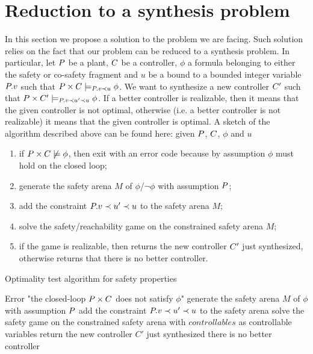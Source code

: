 
\section{Reduction to a synthesis problem}
\label{sec:reduction-to-synthesis}

In this section we propose a solution to the problem we are facing.
Such solution relies on the fact that our problem can be reduced to a synthesis problem.
In particular, let $P$ be a plant, $C$ be a controller, $\phi$ a formula belonging to either the safety or co-safety fragment and $u$ be a bound to a bounded integer variable $P.v$ such that $P \times C \models_{P.v \prec u} \phi$.
We want to synthesize a new controller $C'$ such that $P \times C' \models_{P.v \prec u' \prec u} \phi$.
If a better controller is realizable, then it means that the given controller is not optimal, otherwise (i.e. a better controller is not realizable) it means that the given controller is optimal.
A sketch of the algorithm described above can be found here: given $P$, $C$, $\phi$ and $u$
\begin{enumerate}[label=\enumpar]
    \item if $\closedloop{\plant}{\controller} \not\models \phi$, then exit with an error code because by assumption $\phi$ must hold on the closed loop;
    \item generate the safety arena $M$ of $\phi$/$\neg\phi$ with assumption $P$;
    \item add the constraint $P.v \prec u' \prec u$ to the safety arena $M$;
    \item solve the safety/reachability game on the constrained safety arena $M$;
    \item if the game is realizable, then returns the new controller $C'$ just synthesized, otherwise returns that there is no better controller.
\end{enumerate}

\begin{algorithm}[ht]
    \caption{Optimality test algorithm for safety properties}
\begin{algorithmic}[1]
    \If{$\closedloop{\plant}{\controller} \not\models \phi$}
        \State Error "the closed-loop $P \times C$ does not satisfy $\phi$"
    \EndIf
    \State generate the safety arena $M$ of $\phi$ with assumption $P$
    \State add the constraint $P.v \prec u' \prec u$ to the safety arena
    \State solve the safety game on the constrained safety arena with $controllables$ as controllable variables
        \State \Return return the new controller $C'$ just synthesized
    \Else
        \State \Return there is no better controller
    \EndIf
\EndProcedure
\end{algorithmic}
\end{algorithm}

